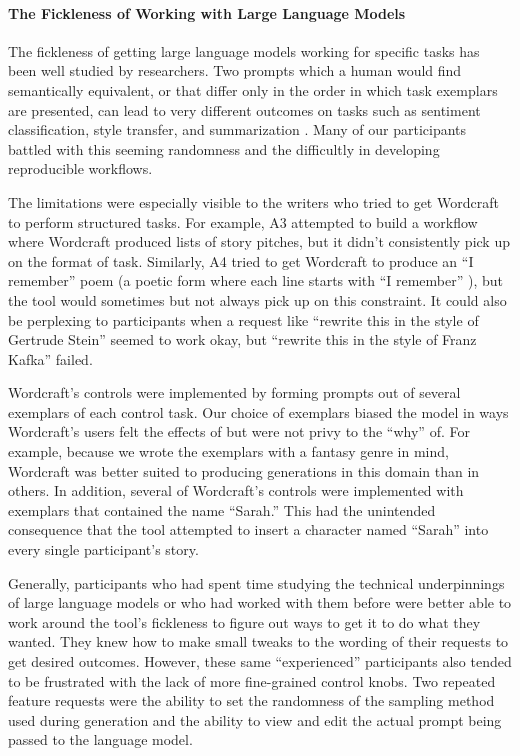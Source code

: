 \paragraph{The Fickleness of Working with Large Language Models}
The fickleness of getting large language models working for specific tasks has been well studied by researchers.
Two prompts which a human would find semantically equivalent, or that differ only in the order in which task exemplars are presented, can lead to very different outcomes on tasks such as sentiment classification, style transfer, and summarization \citep{lu2022fantastically,webson2021prompt}.
Many of our participants battled with this seeming randomness and the difficultly in developing reproducible workflows.

The limitations were especially visible to the writers who tried to get Wordcraft to perform structured tasks.
For example, A3 attempted to build a workflow where Wordcraft produced lists of story pitches, but it didn't consistently pick up on the format of task.
Similarly, A4 tried to get Wordcraft to produce an ``I remember'' poem (a poetic form where each line starts with ``I remember'' \citep{nla.cat-vn4853059}), but the tool would sometimes but not always pick up on this constraint.
It could also be perplexing to participants when a request like ``rewrite this in the style of Gertrude Stein'' seemed to work okay, but ``rewrite this in the style of Franz Kafka'' failed.

Wordcraft's controls were implemented by forming prompts out of several exemplars of each control task.
Our choice of exemplars biased the model in ways Wordcraft's users felt the effects of but were not privy to the ``why'' of.
For example, because we wrote the exemplars with a fantasy genre in mind, Wordcraft was better suited to producing generations in this domain than in others.
In addition, several of Wordcraft's controls were implemented with exemplars that contained the name ``Sarah.'' This had the unintended consequence that the tool attempted to insert a character named ``Sarah'' into every single participant's story.

Generally, participants who had spent time studying the technical underpinnings of large language models or who had worked with them before were better able to work around the tool's fickleness to figure out ways to get it to do what they wanted.
They knew how to make small tweaks to the wording of their requests to get desired outcomes.
However, these same ``experienced'' participants also tended to be frustrated with the lack of more fine-grained control knobs.
Two repeated feature requests were the ability to set the randomness of the sampling method used during generation and the ability to view and edit the actual prompt being passed to the language model.

